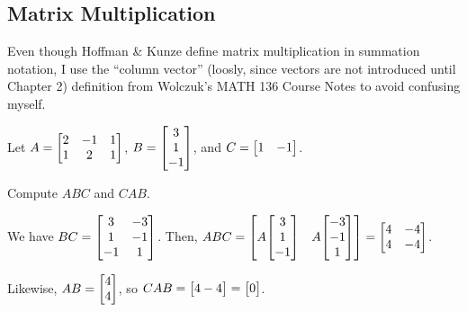 \documentclass{agony}
\begin{document}
\subsection{Matrix Multiplication}

Even though Hoffman \& Kunze define matrix multiplication in summation notation,
I use the ``column vector'' (loosly, since vectors are not introduced until Chapter 2) definition
from Wolczuk's MATH 136 Course Notes to avoid confusing myself.

\begin{xca}
  Let $A = \mqty[2&-1&1 \\ 1&2&1]$, $B = \mqty[3\\1\\-1]$, and $C = \mqty[1&-1]$.

  Compute $ABC$ and $CAB$.
\end{xca}
\begin{sol}
  We have $BC = \mqty[3&-3 \\ 1&-1 \\ -1&1]$.
  Then, $ABC = \mqty[A\mqty[3\\1\\-1] & A\mqty[-3\\-1\\1]] = \mqty[4&-4 \\ 4&-4]$.

  Likewise, $AB = \mqty[4\\4]$, so $CAB = \mqty[4-4] = \mqty[0]$.
\end{sol}
\end{document}
